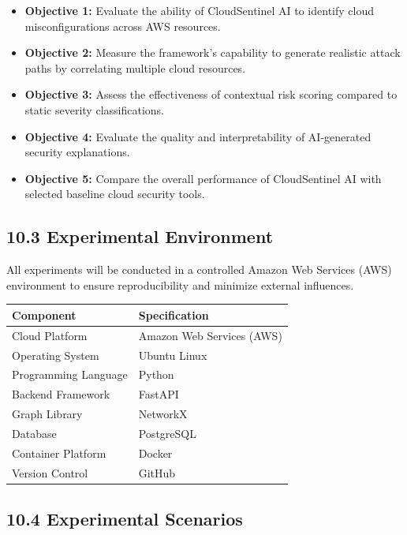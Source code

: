 \begin{itemize}
\tightlist
\item
  \textbf{Objective 1:} Evaluate the ability of CloudSentinel AI to identify cloud misconfigurations across AWS resources.\\
\item
  \textbf{Objective 2:} Measure the framework's capability to generate realistic attack paths by correlating multiple cloud resources.\\
\item
  \textbf{Objective 3:} Assess the effectiveness of contextual risk scoring compared to static severity classifications.\\
\item
  \textbf{Objective 4:} Evaluate the quality and interpretability of AI-generated security explanations.\\
\item
  \textbf{Objective 5:} Compare the overall performance of CloudSentinel AI with selected baseline cloud security tools.
\end{itemize}

\subsection{10.3 Experimental Environment}

All experiments will be conducted in a controlled Amazon Web Services (AWS) environment to ensure reproducibility and minimize external influences.

\begin{longtable}[]{@{}ll@{}}
\toprule\noalign{}
Component & Specification \\
\midrule\noalign{}
\endhead
\bottomrule\noalign{}
\endlastfoot
Cloud Platform & Amazon Web Services (AWS) \\
Operating System & Ubuntu Linux \\
Programming Language & Python \\
Backend Framework & FastAPI \\
Graph Library & NetworkX \\
Database & PostgreSQL \\
Container Platform & Docker \\
Version Control & GitHub \\
\end{longtable}

\subsection{10.4 Experimental Scenarios}

